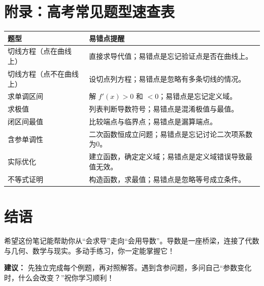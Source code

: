 \documentclass[10pt]{article}
\begin{document}
\section*{附录：高考常见题型速查表}
\begin{tabular}{|p{5cm}|p{8cm}|}
\hline
\textbf{题型} & \textbf{易错点提醒} \\
\hline
切线方程（点在曲线上） & 直接求导代值；易错点是忘记验证点是否在曲线上。 \\
\hline
切线方程（点不在曲线上） & 设切点列方程；易错点是忽略有多条切线的情况。 \\
\hline
求单调区间 & 解 $f'(x) > 0$ 和 $<0$；易错点是忘记定义域。 \\
\hline
求极值 & 列表判断导数符号；易错点是混淆极值与最值。 \\
\hline
闭区间最值 & 比较端点与临界点；易错点是漏算端点。 \\
\hline
含参单调性 & 二次函数恒成立问题；易错点是忘记讨论二次项系数为0。 \\
\hline
实际优化 & 建立函数，确定定义域；易错点是定义域错误导致最值无效。 \\
\hline
不等式证明 & 构造函数，求最值；易错点是忽略等号成立条件。 \\
\hline
\end{tabular}

\section*{结语}
希望这份笔记能帮助你从“会求导”走向“会用导数”。导数是一座桥梁，连接了代数与几何、数学与现实。多动手练习，你一定能掌握它！

\textbf{建议：} 先独立完成每个例题，再对照解答。遇到含参问题，多问自己“参数变化时，什么会改变？”祝你学习顺利！
\end{document}
